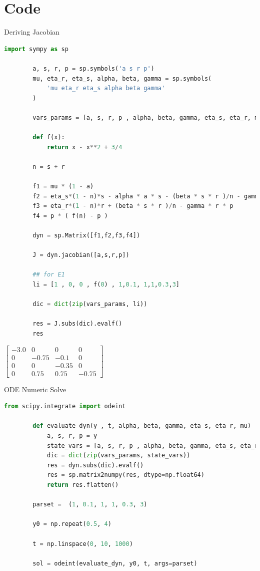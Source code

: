 \documentclass{beamer}
\begin{document}
\section{Code}

\begin{frame}{Deriving Jacobian}
	
	\begin{lstlisting}[language=Python]
		import sympy as sp
		
		a, s, r, p = sp.symbols('a s r p')
		mu, eta_r, eta_s, alpha, beta, gamma = sp.symbols(
			'mu eta_r eta_s alpha beta gamma'
		)
		
		vars_params = [a, s, r, p , alpha, beta, gamma, eta_s, eta_r, mu]
		
		def f(x):
			return x - x**2 + 3/4
		
		n = s + r
		
		f1 = mu * (1 - a)
		f2 = eta_s*(1 - n)*s - alpha * a * s - (beta * s * r )/n - gamma * s * p
		f3 = eta_r*(1 - n)*r + (beta * s * r )/n - gamma * r * p
		f4 = p * ( f(n) - p )
		
		dyn = sp.Matrix([f1,f2,f3,f4])
		
		J = dyn.jacobian([a,s,r,p])
		
		## for E1
		li = [1 , 0, 0 , f(0) , 1,0.1, 1,1,0.3,3]
		
		dic = dict(zip(vars_params, li))
		
		res = J.subs(dic).evalf()
		res
	\end{lstlisting}
	
	$\displaystyle \left[\begin{matrix}-3.0 & 0 & 0 & 0\\0 & -0.75 & -0.1 & 0\\0 & 0 & -0.35 & 0\\0 & 0.75 & 0.75 & -0.75\end{matrix}\right]$
	
\end{frame}


\begin{frame}{ODE Numeric Solve}
	
	
	\begin{lstlisting}[language=Python]
		from scipy.integrate import odeint
		
		def evaluate_dyn(y , t, alpha, beta, gamma, eta_s, eta_r, mu) -> tuple:
			a, s, r, p = y
			state_vars = [a, s, r, p , alpha, beta, gamma, eta_s, eta_r, mu]
			dic = dict(zip(vars_params, state_vars))
			res = dyn.subs(dic).evalf()
			res = sp.matrix2numpy(res, dtype=np.float64)
			return res.flatten()
		
		parset =  (1, 0.1, 1, 1, 0.3, 3)
		
		y0 = np.repeat(0.5, 4)
		
		t = np.linspace(0, 10, 1000)
		
		sol = odeint(evaluate_dyn, y0, t, args=parset)
	\end{lstlisting}
	
\end{frame}
\end{document}
